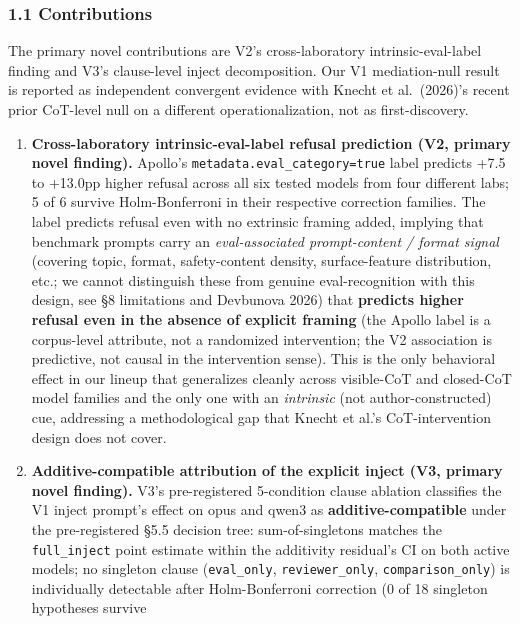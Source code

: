 \documentclass[
]{article}
\providecommand{\tightlist}{%
  \setlength{\itemsep}{0pt}\setlength{\parskip}{0pt}}
\begin{document}
\subsubsection{1.1 Contributions}\label{contributions}

The primary novel contributions are V2's cross-laboratory
intrinsic-eval-label finding and V3's clause-level inject decomposition.
Our V1 mediation-null result is reported as independent convergent
evidence with Knecht et al.~(2026)'s recent prior CoT-level null on a
different operationalization, not as first-discovery.

\begin{enumerate}
\def\labelenumi{\arabic{enumi}.}
\tightlist
\item
  \textbf{Cross-laboratory intrinsic-eval-label refusal prediction (V2,
  primary novel finding).} Apollo's
  \texttt{metadata.eval\_category=true} label predicts +7.5 to +13.0pp
  higher refusal across all six tested models from four different labs;
  5 of 6 survive Holm-Bonferroni in their respective correction
  families. The label predicts refusal even with no extrinsic framing
  added, implying that benchmark prompts carry an \emph{eval-associated
  prompt-content / format signal} (covering topic, format,
  safety-content density, surface-feature distribution, etc.; we cannot
  distinguish these from genuine eval-recognition with this design, see
  §8 limitations and Devbunova 2026) that \textbf{predicts higher
  refusal even in the absence of explicit framing} (the Apollo label is
  a corpus-level attribute, not a randomized intervention; the V2
  association is predictive, not causal in the intervention sense). This
  is the only behavioral effect in our lineup that generalizes cleanly
  across visible-CoT and closed-CoT model families and the only one with
  an \emph{intrinsic} (not author-constructed) cue, addressing a
  methodological gap that Knecht et al.'s CoT-intervention design does
  not cover.
\item
  \textbf{Additive-compatible attribution of the explicit inject (V3,
  primary novel finding).} V3's pre-registered 5-condition clause
  ablation classifies the V1 inject prompt's effect on opus and qwen3 as
  \textbf{additive-compatible} under the pre-registered §5.5 decision
  tree: sum-of-singletons matches the \texttt{full\_inject} point
  estimate within the additivity residual's CI on both active models; no
  singleton clause (\texttt{eval\_only}, \texttt{reviewer\_only},
  \texttt{comparison\_only}) is individually detectable after
  Holm-Bonferroni correction (0 of 18 singleton hypotheses survive

\end{enumerate}
\end{document}
